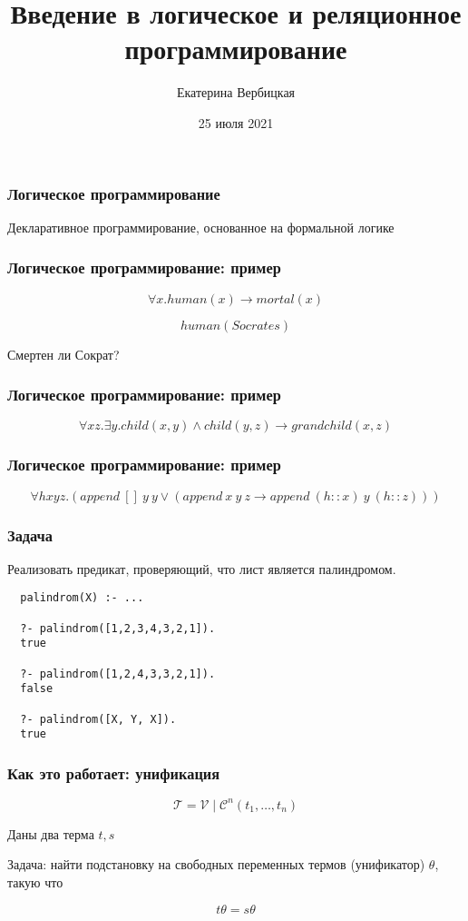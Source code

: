 \documentclass{beamer}
\title[]{Введение в логическое и реляционное программирование}
\subtitle[]{}
\institute[]{
Лаборатория языков инструментов JetBrains\\
}
\author[]{Екатерина Вербицкая}
\date{25 июля 2021}
\begin{document}
{
  \begin{frame}
    \titlepage
  \end{frame}
}


\begin{frame}[fragile]
  \frametitle{Логическое программирование}
\begin{center}
  Декларативное программирование, основанное на формальной логике
\end{center}
\end{frame}

\begin{frame}[fragile]
  \frametitle{Логическое программирование: пример}
\[
  \forall x. human(x) \to mortal(x)
\]

\[
  human(Socrates)
\]

\vspace{1cm}

\begin{center}
  Смертен ли Сократ?
\end{center}
\end{frame}

\begin{frame}[fragile]
  \frametitle{Логическое программирование: пример}
\[
  \forall x z. \exists y. child (x,y) \wedge child(y,z) \to grandchild(x,z)
\]
\end{frame}

\begin{frame}[fragile]
  \frametitle{Логическое программирование: пример}
\[
  \forall h x y z. (append \ [] \ y \ y \vee (append \ x \ y \ z \to append \ (h :: x) \  y \ (h :: z)))
\]
\end{frame}

\begin{frame}[fragile]
  \frametitle{Задача}
Реализовать предикат, проверяющий, что лист является палиндромом.

\begin{verbatim}
  palindrom(X) :- ...

  ?- palindrom([1,2,3,4,3,2,1]).
  true

  ?- palindrom([1,2,4,3,3,2,1]).
  false

  ?- palindrom([X, Y, X]).
  true
\end{verbatim}

\end{frame}

\begin{frame}[fragile]
  \frametitle{Как это работает: унификация}

\[
  \mathcal{T} = \mathcal{V} \mid \mathcal{C}^n (t_1, \dots, t_n)
\]

\begin{center}
  Даны два терма $t, s$
\end{center}

\begin{center}
  Задача: найти подстановку на свободных переменных термов (унификатор) $\theta$, такую что
\end{center}

\[
  t \theta = s \theta
\]

\end{frame}
\end{document}
